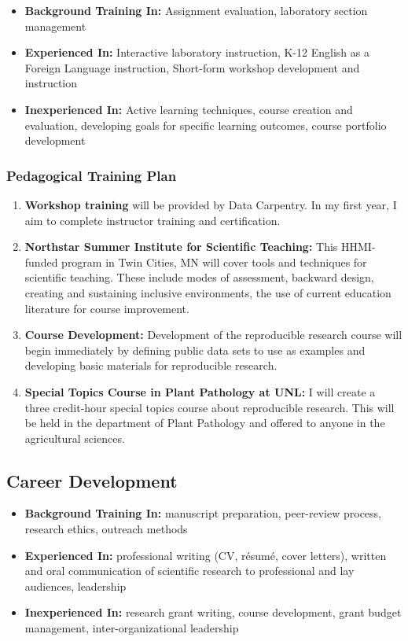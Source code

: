 \documentclass[12pt,letterpaper]{article}
\begin{document}
\begin{itemize}
  \item \textbf{Background Training In:} Assignment evaluation, laboratory section management
  \item \textbf{Experienced In:} Interactive laboratory instruction, K-12 English as a Foreign Language instruction, Short-form workshop development and
  instruction
  \item \textbf{Inexperienced In:} Active learning techniques, course creation and evaluation, developing goals for specific learning outcomes, course portfolio development
\end{itemize}

\subsubsection*{Pedagogical Training Plan}

\begin{enumerate}
  \item \textbf{Workshop training} will be provided by Data Carpentry. In my first year, I aim to complete instructor training and certification.
  \item \textbf{Northstar Summer Institute for Scientific Teaching:} This HHMI-funded program in Twin Cities, MN will cover tools and techniques for scientific teaching. These include modes of assessment, backward design, creating and sustaining inclusive environments, the use of current education literature for course improvement.
  \item \textbf{Course Development:} Development of the reproducible research course will begin immediately by defining public data sets to use as examples and developing basic materials for reproducible research.
  \item \textbf{Special Topics Course in Plant Pathology at UNL:} I will create a three credit-hour special topics course about reproducible research. This will be held in the department of Plant Pathology and offered to anyone in the agricultural sciences. 
\end{enumerate}


\subsection{Career Development}

\begin{itemize}
  \item \textbf{Background Training In:} 
  manuscript preparation, peer-review process, research ethics, outreach methods
  \item \textbf{Experienced In:} 
  professional writing (CV, r\'esum\'e, cover letters), written and oral communication of scientific research to professional and lay audiences, leadership
  \item \textbf{Inexperienced In:} research grant writing, course development, grant budget management, inter-organizational leadership
\end{itemize}
\end{document}
